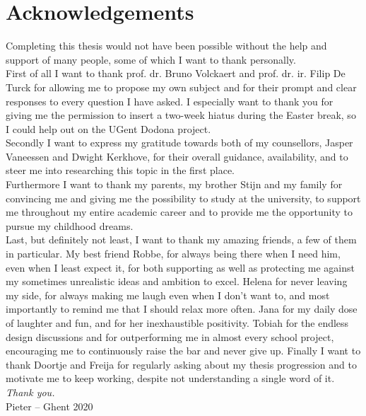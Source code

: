\chapter*{Acknowledgements}

Completing this thesis would not have been possible without the help and support of many people, some of which I want to thank personally.\\

\noindent First of all I want to thank prof. dr. Bruno Volckaert and prof. dr. ir. Filip De Turck for allowing me to propose my own subject and for their prompt and clear responses to every question I have asked. I especially want to thank you for giving me the permission to insert a two-week hiatus during the Easter break, so I could help out on the UGent Dodona project.\\

\noindent Secondly I want to express my gratitude towards both of my counsellors, Jasper Vaneessen and Dwight Kerkhove, for their overall guidance, availability, and to steer me into researching this topic in the first place.\\

\noindent Furthermore I want to thank my parents, my brother Stijn and my family for convincing me and giving me the possibility to study at the university, to support me throughout my entire academic career and to provide me the opportunity to pursue my childhood dreams.\\

\noindent Last, but definitely not least, I want to thank my amazing friends, a few of them in particular. My best friend Robbe, for always being there when I need him, even when I least expect it, for both supporting as well as protecting me against my sometimes unrealistic ideas and ambition to excel. Helena for never leaving my side, for always making me laugh even when I don't want to, and most importantly to remind me that I should relax more often. Jana for my daily dose of laughter and fun, and for her inexhaustible positivity. Tobiah for the endless design discussions and for outperforming me in almost every school project, encouraging me to continuously raise the bar and never give up. Finally I want to thank Doortje and Freija for regularly asking about my thesis progression and to motivate me to keep working, despite not understanding a single word of it.\\

\noindent \emph{Thank you.}\\

\noindent Pieter -- Ghent 2020